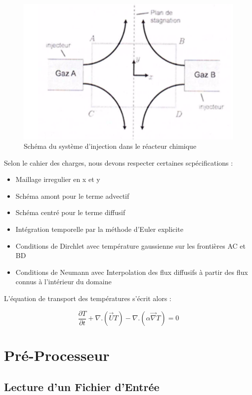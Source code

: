 \documentclass[a4paper,oneside]{article}
\makeatletter
\def\bigcenter{\trivlist \bigcentering\item\relax}
\def\bigcentering{\let\\\@centercr\rightskip\@bigflushglue%
\leftskip\@bigflushglue
\parindent\z@\parfillskip\z@skip}
\makeatother
\begin{document}
\begin{figure}[h!]
\bigcenter
\includegraphics[scale=0.8]{Schema_reacteur.PNG}
\caption{Schéma du système d'injection dans le réacteur chimique}
\end{figure}

Selon le cahier des charges, nous devons respecter certaines scpécifications :
\begin{itemize}
	\item Maillage irregulier en x et y
	\item Schéma amont pour le terme advectif
	\item Schéma centré pour le terme diffusif
	\item Intégration temporelle par la méthode d'Euler explicite
	\item Conditions de Dirchlet avec température gaussienne sur les frontières AC et BD
	\item Conditions de Neumann avec Interpolation des flux diffusifs à partir des flux connus à l'intérieur du domaine\\
\end{itemize}

L'équation de transport des températures s'écrit alors :

\begin{equation}	\label{eqderivpart}
\frac{\partial T}{\partial t} + \nabla . (\overrightarrow{U}T) - \nabla . (\alpha \overrightarrow{\nabla}T) = 0 
\end{equation}

\section{Pré-Processeur}
\subsection{Lecture d'un Fichier d'Entrée}
\end{document}
